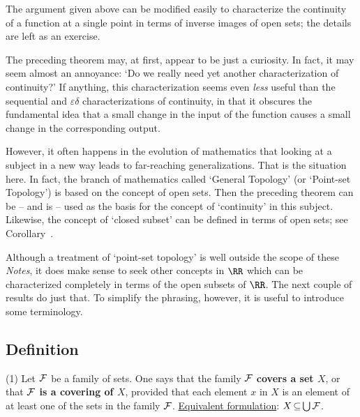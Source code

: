 \V

\hspace*{\parindent}The argument given above can be modified easily to characterize the continuity of a function at a single point in terms of inverse images of open sets; the details are left as an exercise.


\V
\V

        The preceding theorem may, at first, appear to be just a curiosity. In fact, it may seem almost an annoyance:
    `Do we really need yet another characterization of continuity?'
    If anything, this characterization seems even {\em less} useful than the sequential and ${\varepsilon}{\delta}$ characterizations of continuity,
    in that it obscures the fundamental idea that a small change in the input of the function causes a small change in the corresponding output.

        However, it often happens in the evolution of mathematics that looking at a subject in a new way leads to far-reaching generalizations.
    That is the situation here. In fact, the branch of mathematics called `General Topology' (or `Point-set Topology')
    is based on the concept of open sets. Then the preceding theorem can be -- and is -- used as the basis for the concept of `continuity' in this subject.
    Likewise, the concept of `closed subset' can be defined in terms of open sets; see Corollary~.

    Although a treatment of `point-set topology' is well outside the scope of these {\em Notes},
    it does make sense to seek other concepts in ${\RR}$ which can be characterized completely in terms of the open subsets of ${\RR}$.
    The next couple of results do just that.
    To simplify the phrasing, however, it is useful to introduce some terminology.

\V

             \subsection{\small{\bf Definition}}
            \label{ThmF30.35}

\V

\hspace*{\parindent}(1) Let ${\cal F}$ be a family of sets. One says that the family ${\cal F}$ {\bf covers a set $X$}, or that {\bf ${\cal F}$ is a covering of $X$},
    provided that each element $x$ in $X$ is an element of at least one of the sets in the family ${\cal F}$.
        \underline{Equivalent formulation}: $X \,{\subseteq}\, {\bigcup}\, {\cal F}$.

